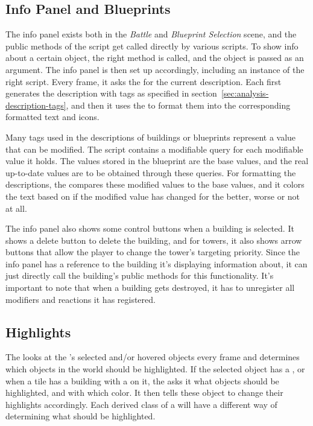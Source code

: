 \subsection{Info Panel and Blueprints}

The info panel exists both in the \emph{Battle} and \emph{Blueprint Selection} scene, and the public methods of the  script get called directly by various scripts.
To show info about a certain object, the right method is called, and the object is passed as an argument.
The info panel is then set up accordingly, including an instance of the right  script.
Every frame, it asks the  for the current description.
Each  first generates the description with tags as specified in section~\ref{sec:analysis-description-tags}, and then it uses the  to format them into the corresponding formatted text and icons.

Many tags used in the descriptions of buildings or blueprints represent a value that can be modified.
The  script contains a modifiable query for each modifiable value it holds.
The values stored in the blueprint are the base values, and the real up-to-date values are to be obtained through these queries.
For formatting the descriptions, the  compares these modified values to the base values, and it colors the text based on if the modified value has changed for the better, worse or not at all.

The info panel also shows some control buttons when a building is selected.
It shows a delete button to delete the building, and for towers, it also shows arrow buttons that allow the player to change the tower's targeting priority.
Since the info panel has a reference to the building it's displaying information about, it can just directly call the building's public methods for this functionality.
It's important to note that when a building gets destroyed, it has to unregister all modifiers and reactions it has registered.

\subsection{Highlights}

The  looks at the 's selected and/or hovered objects every frame and determines which objects in the world should be highlighted.
If the selected object has a , or when a tile has a building with a  on it, the  asks it what  objects should be highlighted, and with which color.
It then tells these object to change their highlights accordingly.
Each derived class of a  will have a different way of determining what should be highlighted.

